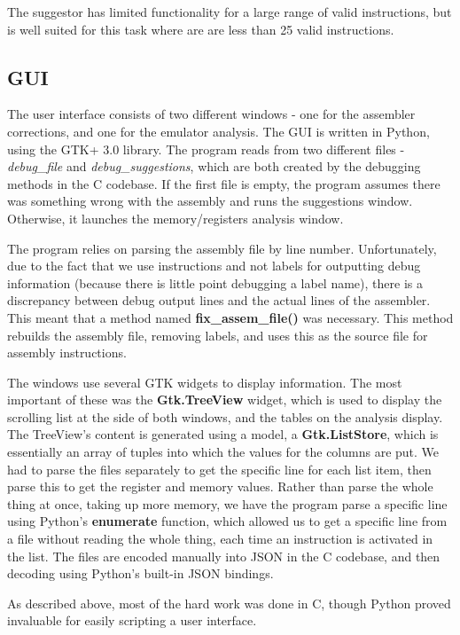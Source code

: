\documentclass[11pt]{article}
\begin{document}
The suggestor has limited functionality for a large range of valid instructions, but is well suited for this task where are are less than 25 valid instructions.

\subsection{GUI}
The user interface consists of two different windows - one for the assembler corrections, and one for the emulator analysis. The GUI is written in Python, using the GTK+ 3.0 library. The program reads from two different files - {\it debug\_file} and {\it debug\_suggestions}, which are both created by the debugging methods in the C codebase. If the first file is empty, the program assumes there was something wrong with the assembly and runs the suggestions window. Otherwise, it launches the memory/registers analysis window.

The program relies on parsing the assembly file by line number. Unfortunately, due to the fact that we use instructions and not labels for outputting debug information (because there is little point debugging a label name), there is a discrepancy between debug output lines and the actual lines of the assembler. This meant that a method named {\bf fix\_assem\_file()} was necessary. This method rebuilds the assembly file, removing labels, and uses this as the source file for assembly instructions.

The windows use several GTK widgets to display information. The most important of these was the {\bf Gtk.TreeView} widget, which is used to display the scrolling list at the side of both windows, and the tables on the analysis display. The TreeView's content is generated using a model, a {\bf Gtk.ListStore}, which is essentially an array of tuples into which the values for the columns are put. We had to parse the files separately to get the specific line for each list item, then parse this to get the register and memory values. Rather than parse the whole thing at once, taking up more memory, we have the program parse a specific line using Python's {\bf enumerate} function, which allowed us to get a specific line from a file without reading the whole thing, each time an instruction is activated in the list. The files are encoded manually into JSON in the C codebase, and then decoding using Python's built-in JSON bindings.

As described above, most of the hard work was done in C, though Python proved invaluable for easily scripting a user interface.
\end{document}
